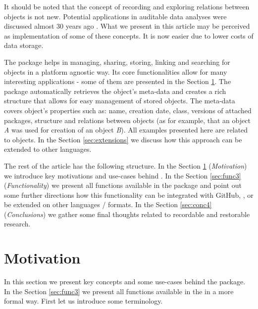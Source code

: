 \documentclass[nojss]{jss}\usepackage[]{graphicx}\usepackage[]{color}
\begin{document}
It should be noted that the concept of recording and exploring relations between objects is not new. Potential applications in auditable data analyses were  discussed almost 30 years ago \citep[see][]{Auditing}. What we present in this article may be perceived as implementation of some of these concepts. It is now easier due to lower costs of data storage.

The  package helps in managing, sharing, storing, linking and searching for  objects {in a platform agnostic way}. Its core functionalities allow for many interesting applications - some of them are presented in the Section \ref{sec:mot2}. The  package automatically retrieves the object's meta-data and creates a rich structure that allows for easy management of stored  objects. The meta-data covers object's properties such as: name, creation date, class, versions of attached packages, structure and relations between  objects (as for example, that an object \textit{A} was used for creation of an object \textit{B}). All examples presented here are related to  objects. In the Section \ref{sec:extensions} we discuss how this approach can be extended to other languages.

The rest of the article has the following structure. In the Section \ref{sec:mot2} (\textit{Motivation}) we introduce key motivations and use-cases behind . In the Section \ref{sec:func3} (\textit{Functionality}) we present all functions available in the package and point out some further directions how this functionality can be integrated with GitHub, , or be extended on other languages / formats. In the Section \ref{sec:conc4} (\textit{Conclusions}) we gather some final thoughts related to recordable and restorable research.


\section{Motivation}
\label{sec:mot2}

In this section we present key concepts and some use-cases behind the  package. In the Section \ref{sec:func3} we present all functions available in the  in a more formal way. First let us introduce some terminology. 
\end{document}
